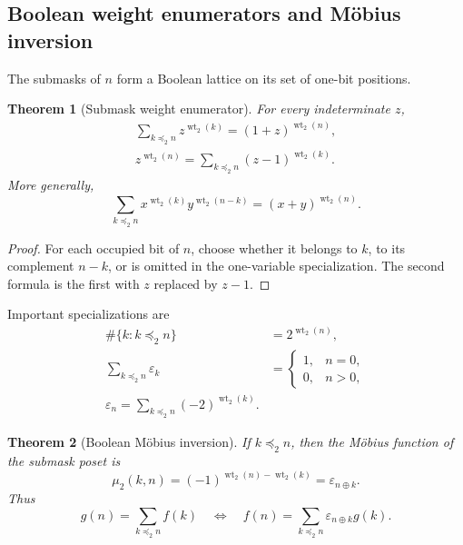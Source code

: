 \documentclass[11pt,oneside]{article}
\numberwithin{equation}{section}
\newtheorem{theorem}{Theorem}[section]
\theoremstyle{definition}
\theoremstyle{remark}
\newcommand{\wt}{\operatorname{wt}_2}
\newcommand{\eps}{\varepsilon}
\newcommand{\xor}{\mathbin{\oplus}}
\newcommand{\submask}{\mathrel{\preccurlyeq_2}}
\begin{document}
\subsection{Boolean weight enumerators and M\"obius inversion}

The submasks of \(n\) form a Boolean lattice on its set of one-bit positions.

\begin{theorem}[Submask weight enumerator]
\label{thm:submask-enumerator}
For every indeterminate \(z\),
\begin{align}
  \boxed{
  \sum_{k\submask n}z^{\wt(k)}=(1+z)^{\wt(n)},}
  \label{eq:submask-enumerator}\\
  \boxed{
  z^{\wt(n)}=\sum_{k\submask n}(z-1)^{\wt(k)}.}
  \label{eq:submask-inversion-polynomial}
\end{align}
More generally,
\begin{equation}
  \sum_{k\submask n}
    x^{\wt(k)}y^{\wt(n-k)}=(x+y)^{\wt(n)}.
  \label{eq:submask-bivariate}
\end{equation}
\end{theorem}

\begin{proof}
For each occupied bit of \(n\), choose whether it belongs to \(k\), to its
complement \(n-k\), or is omitted in the one-variable specialization.
The second formula is the first with \(z\) replaced by \(z-1\).
\end{proof}

Important specializations are
\begin{align}
  \#\{k:k\submask n\}&=2^{\wt(n)},
  \label{eq:submask-count}\\
  \sum_{k\submask n}\eps_k
  &=\begin{cases}1,&n=0,\\0,&n>0,\end{cases}
  \label{eq:submask-cancellation}\\
  \boxed{
  \eps_n=\sum_{k\submask n}(-2)^{\wt(k)}.}
  \label{eq:submask-reconstruction}
\end{align}

\begin{theorem}[Boolean M\"obius inversion]
\label{thm:boolean-mobius}
If \(k\submask n\), then the M\"obius function of the submask poset is
\begin{equation}
  \mu_2(k,n)=(-1)^{\wt(n)-\wt(k)}=\eps_{n\xor k}.
  \label{eq:boolean-mobius}
\end{equation}
Thus
\begin{equation}
  g(n)=\sum_{k\submask n}f(k)
  \quad\Longleftrightarrow\quad
  \boxed{
  f(n)=\sum_{k\submask n}\eps_{n\xor k}g(k).}
  \label{eq:boolean-mobius-inversion}
\end{equation}
\end{theorem}
\end{document}
